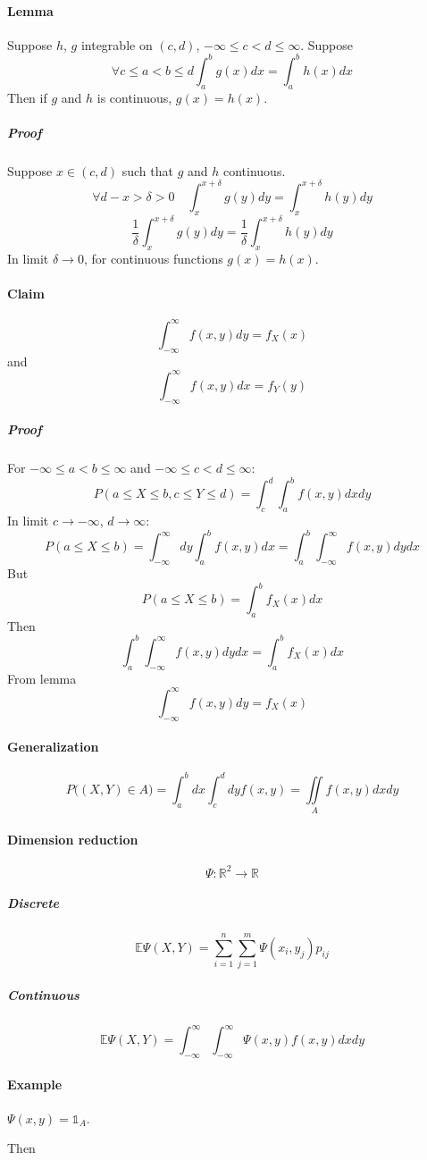 \paragraph{Lemma}
Suppose $h$, $g$ integrable on $(c,d)$, $-\infty \leq c < d \leq \infty$. Suppose
$$\forall c \leq a < b \leq d \int_a^b g(x) dx = \int_a^b h(x) dx$$
Then if $g$ and $h$ is continuous, $g(x) = h(x)$.
\subparagraph{Proof}
Suppose $x \in (c,d)$ such that $g$ and $h$ continuous.
$$\forall d-x > \delta > 0 \quad \int_x^{x+\delta} g(y) dy = \int_x^{x+\delta} h(y) dy  $$
$$\frac{1}{\delta}\int_x^{x+\delta} g(y) dy =\frac{1}{\delta} \int_x^{x+\delta} h(y) dy $$
In limit $\delta \to 0$, for continuous functions $g(x)=h(x)$.
\paragraph{Claim} 
$$\int_{-\infty}^{\infty} f(x,y) dy = f_X(x)$$
and
$$\int_{-\infty}^{\infty} f(x,y) dx = f_Y(y)$$

\subparagraph{Proof}
For $-\infty \leq a < b \leq \infty $ and  $-\infty \leq c < d \leq \infty $:
$$P(a\leq X\leq b, c \leq Y \leq d) = \int_c^d \int _a^b f(x,y) dx dy$$
In limit $c \to -\infty$, $d \to \infty$:
$$P(a\leq X\leq b) = \int_{-\infty}^\infty dy \int _a^b f(x,y) dx = \int _a^b  \int_{-\infty}^\infty  f(x,y) dy  dx $$
But
$$P(a\leq X\leq b) = \int_a^b f_X(x) dx$$
Then
$$\int _a^b  \int_{-\infty}^\infty  f(x,y) dy  dx  = \int_a^b f_X(x) dx$$
From lemma
$$ \int_{-\infty}^\infty  f(x,y) dy  = f_X(x)$$

\paragraph{Generalization}
$$P\big( (X,Y) \in A \big) = \int_a^b dx \int_c^d dy f(x,y) = \iint\limits_A f(x,y) dx dy$$

\paragraph{Dimension reduction}
$$\Psi: \mathbb{R}^2 \to \mathbb{R}$$
\subparagraph{Discrete}
$$\mathbb{E} \Psi(X,Y) = \sum_{i=1}^n \sum_{j=1}^m \Psi(x_i, y_j) p_{ij} $$
\subparagraph{Continuous}
$$\mathbb{E} \Psi(X,Y) = \int_{-\infty}^\infty\int_{-\infty}^\infty \Psi(x,y)f(x,y) dxdy$$
\paragraph{Example}
$\Psi(x,y) =  \mathds{1}_A$.

Then

